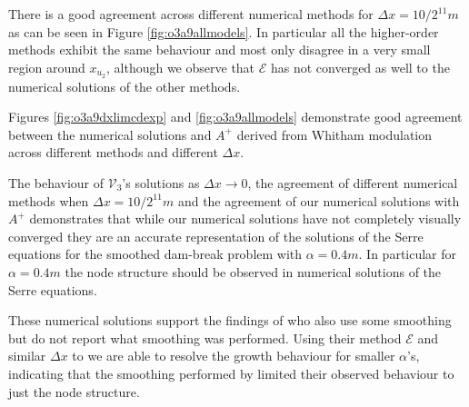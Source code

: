 \documentclass[times]{elsarticle}
\begin{document}
There is a good agreement across different numerical methods for $\Delta x = 10/2^{11}m$ as can be seen in Figure \ref{fig:o3a9allmodels}. In particular all the higher-order methods exhibit the same behaviour and most only disagree in a very small region around $x_{u_2}$, although we observe that $\mathcal{E}$ has not converged as well to the numerical solutions of the other methods. 

Figures \ref{fig:o3a9dxlimcdexp} and \ref{fig:o3a9allmodels} demonstrate good agreement between the numerical solutions and $A^+$ derived from Whitham modulation across different methods and different $\Delta x$.

The behaviour of $\mathcal{V}_3$'s solutions as $\Delta x \rightarrow 0$, the agreement of different numerical methods when $\Delta x = 10 / 2^{11}m$  and the agreement of our numerical solutions with $A^+$ demonstrates that while our numerical solutions have not completely visually converged they are an accurate representation of the solutions of the Serre equations for the smoothed dam-break problem with $\alpha = 0.4m$. In particular for $\alpha = 0.4m$ the node structure should be observed in numerical solutions of the Serre equations.

These numerical solutions support the findings of \citet{El-etal-2006} who also use some smoothing \cite{El-Hoefer-2016-11} but do not report what smoothing was performed. Using their method $\mathcal{E}$ and similar $\Delta x$ to \citet{El-etal-2006} we are able to resolve the growth behaviour for smaller $\alpha$'s, indicating that the smoothing performed by \citet{El-etal-2006} limited their observed behaviour to just the node structure. 
\end{document}
